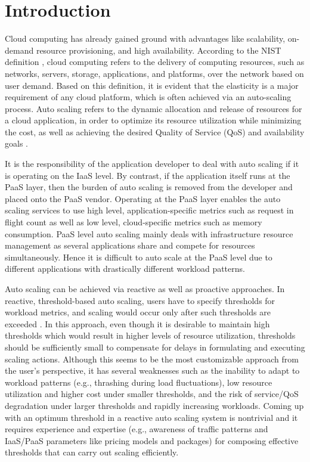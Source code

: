 \section{Introduction}
Cloud computing has already gained ground with advantages like scalability, on-demand resource provisioning, and high availability. According to the NIST definition \cite{Mell_2011}, cloud computing refers to the delivery of computing resources, such as networks, servers, storage, applications, and platforms, over the network based on user demand. Based on this definition, it is evident that the elasticity is a major requirement of any cloud platform, which is often achieved via an auto-scaling process. Auto scaling refers to the dynamic allocation and release of resources for a cloud application, in order to optimize its resource utilization while minimizing the cost, as well as achieving the desired Quality of Service (QoS) and availability goals \cite{Roy_2011} \cite{Armbrust_2010}.

It is the responsibility of the application developer to deal with auto scaling if it is operating on the IaaS level. By contrast, if the application itself runs at the PaaS layer, then the burden of auto scaling is removed from the developer and placed onto the PaaS vendor. Operating at the PaaS layer enables the auto scaling services to use high level, application-specific metrics such as request in flight count as well as low level, cloud-specific metrics such as memory consumption. PaaS level auto scaling mainly deals with infrastructure resource management as several applications share and compete for resources simultaneously. Hence it is difficult to auto scale at the PaaS level due to different applications with drastically different workload patterns.  

Auto scaling can be achieved via reactive as well as proactive approaches. In reactive, threshold-based auto scaling, users have to specify thresholds for workload metrics, and scaling would occur only after such thresholds are exceeded \cite{Lorido_Botran_2014}. In this approach, even though it is desirable to maintain high thresholds which would result in higher levels of resource utilization, thresholds should be sufficiently small to compensate for delays in formulating and executing scaling actions. Although this seems to be the most customizable approach from the user’s perspective, it has several weaknesses \cite{Alipour_2014} such as the inability to adapt to workload patterns (e.g., thrashing during load fluctuations), low resource utilization and higher cost under smaller thresholds, and the risk of service/QoS degradation under larger thresholds and rapidly increasing workloads. Coming up with an optimum threshold in a reactive auto scaling system is nontrivial and it requires experience and expertise (e.g., awareness of traffic patterns and IaaS/PaaS parameters like pricing models and packages) for composing effective thresholds that can carry out scaling efficiently.

